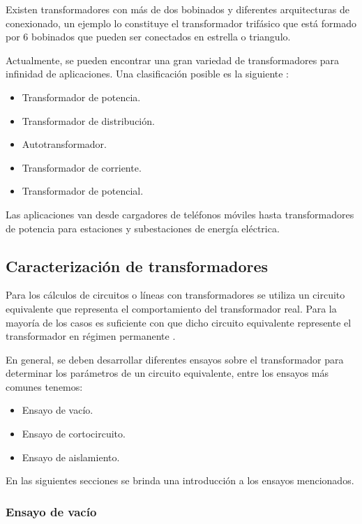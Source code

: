 
Existen transformadores con más de dos bobinados y diferentes arquitecturas de conexionado, un ejemplo lo constituye el transformador trifásico que está formado por 6 bobinados que pueden ser conectados en estrella o triangulo.

Actualmente, se pueden encontrar una gran variedad de transformadores para infinidad de aplicaciones. Una clasificación posible es la siguiente \citep{TRAFO_APL}:

\begin{itemize}
\item Transformador de potencia.
\item Transformador de distribución.
\item Autotransformador.
\item Transformador de corriente.
\item Transformador de potencial.
\end{itemize}

Las aplicaciones van desde cargadores de teléfonos móviles hasta transformadores de potencia para estaciones y subestaciones de energía eléctrica.

\subsection{Caracterización de transformadores}

Para los cálculos de circuitos o líneas con transformadores se utiliza un circuito equivalente que representa el comportamiento del transformador real. Para la mayoría de los casos es suficiente con que dicho circuito equivalente represente el transformador en régimen permanente \citep{TRAFO_WIKI}. 

En general, se deben desarrollar diferentes ensayos sobre el transformador para determinar los parámetros de un circuito equivalente, entre los ensayos más comunes tenemos:

\begin{itemize}
\item Ensayo de vacío.
\item Ensayo de cortocircuito.
\item Ensayo de aislamiento.
\end{itemize}

En las siguientes secciones se brinda una introducción a los ensayos mencionados.

\subsubsection{Ensayo de vacío}

